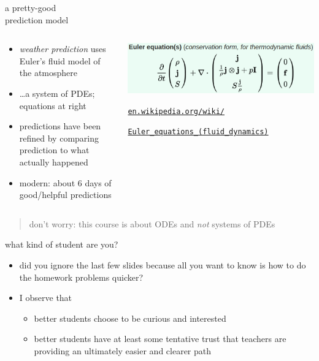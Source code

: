 \documentclass{beamer}
\begin{document}
\begin{frame}{a pretty-good \\ prediction model}

\begin{columns}
\begin{column}{0.5\textwidth}
\begin{itemize}
\item \emph{weather prediction} uses Euler's fluid model of the atmosphere
\item \dots a system of PDEs; equations at right
\item predictions have been refined by comparing prediction to what actually happened
\item modern: about 6 days of good/helpful predictions
\end{itemize}
\end{column}
\begin{column}{0.5\textwidth}
\includegraphics[width=\textwidth]{figs/euler-equations}

\medskip

\quad \tiny \href{https://en.wikipedia.org/wiki/Euler_equations_(fluid_dynamics)}{\texttt{en.wikipedia.org/wiki/}}

\qquad \href{https://en.wikipedia.org/wiki/Euler_equations_(fluid_dynamics)}{\texttt{Euler\_equations\_(fluid\_dynamics)}}
\end{column}
\end{columns}

\bigskip
\begin{quote}
\alert{don't worry}: this course is about ODEs and \emph{not} systems of PDEs
\end{quote}
\end{frame}


\begin{frame}{what kind of student are you?}

\begin{itemize}
\item did you ignore the last few slides because all you want to know is how to do the homework problems quicker?
\item I observe that
    \begin{itemize}
    \item better students choose to be curious and interested
    \item better students have at least some tentative trust that teachers are providing an ultimately easier and clearer path
    \end{itemize}
\end{itemize}
\end{frame}
\end{document}
